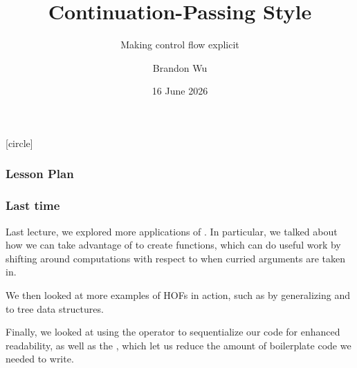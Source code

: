 \documentclass[aspectratio=169]{beamer}
\title{Continuation-Passing Style} %
\subtitle{Making control flow explicit} %
\date{16 June 2026} %
\author{Brandon Wu} %
\newif\ifcolorlambda
\begin{document}
\ifweb
    \renewcommand{\pause}{}
\fi

[circle]

{
\begin{frame}[plain]
    \colorlambdatrue
    \titlepage
\end{frame}
}


\begin{frame}[fragile]
  \frametitle{Lesson Plan}

  \tableofcontents
\end{frame}

\begin{frame}[fragile]
  \frametitle{Last time}

  Last lecture, we explored more applications of .
  In particular, we talked about how we can take advantage of 
  to create  functions, which can do useful work by shifting
  around computations with respect to when curried arguments are taken in.

  \pause
  \vspace{\fill}

  We then looked at more examples of HOFs in action, such as by generalizing
   and  to tree data structures.

  \pause
  \vspace{\fill}

  Finally, we looked at using the \code{|>} operator to sequentialize our
  code for enhanced readability, as well as the , which
  let us reduce the amount of boilerplate code we needed to write.
\end{frame}

\end{document}

